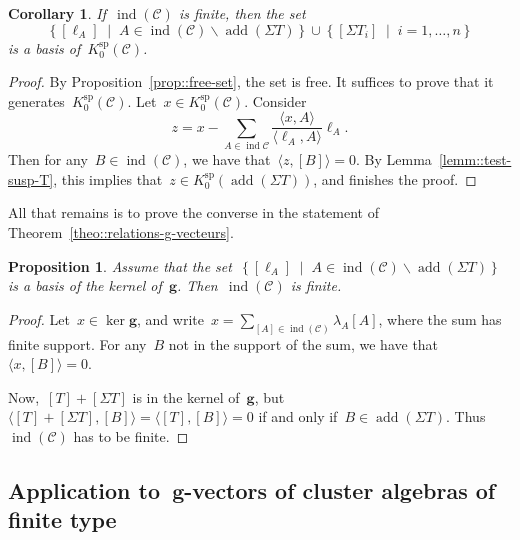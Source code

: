 \documentclass{amsart}
\newtheorem{corollary}[theorem]{Corollary}
\newtheorem{proposition}[theorem]{Proposition}
\theoremstyle{definition}
\renewcommand{\b}[1]{{\boldsymbol{#1}}} %
\newcommand{\set}[2]{\left\{ #1 \;\middle|\; #2 \right\}} %
\newcommand{\ssm}{\smallsetminus} %
\newcommand{\cat}{\mathcal{C}}
\newcommand{\susp}{\Sigma}
\newcommand{\add}{\operatorname{add}}
\newcommand{\spl}{\operatorname{sp}}
\newcommand{\Ksp}{K_0^{\spl}}
\newcommand{\ind}{\operatorname{ind}}
\begin{document}
\begin{corollary}
 If~$\ind(\cat)$ is finite, then the set
 \[
 \set{[\ell_A]}{A\in \ind(\cat) \ssm \add(\susp T)} \cup \set{[\susp T_i]}{i=1, \ldots, n}
 \]
 is a basis of~$\Ksp(\cat)$.
\end{corollary}
\begin{proof}
 By Proposition~\ref{prop::free-set}, the set is free.  It suffices to prove that it generates~$\Ksp(\cat)$.  Let~$x\in \Ksp(\cat)$.  Consider
 \[
  z = x - \sum_{A\in \ind{\cat}} \frac{\langle x, A \rangle}{\langle \ell_A, A\rangle} \ell_A.
 \]
 Then for any~$B\in \ind(\cat)$, we have that~$\langle z, [B] \rangle = 0$.  By Lemma~\ref{lemm::test-susp-T}, this implies that~$z\in \Ksp(\add(\susp T))$, and finishes the proof.
\end{proof}


All that remains is to prove the converse in the statement of Theorem~\ref{theo::relations-g-vecteurs}.

\begin{proposition}
 Assume that the set~$\set{[\ell_A]}{A\in \ind(\cat) \ssm \add(\susp T)}$ is a basis of the kernel of~$\b g$. Then~$\ind(\cat)$ is finite.
\end{proposition}
\begin{proof}
 Let~$x\in \ker \b g$, and write~$x = \sum_{[A]\in \ind(\cat)} \lambda_A[A]$, where the sum has finite support.  For any~$B$ not in the support of the sum, we have that~$\langle x, [B] \rangle = 0$.
 
 Now,~$[T]+[\susp T]$ is in the kernel of~$\b g$, but~$\langle [T] + [\susp T], [B] \rangle = \langle [T], [B] \rangle = 0$ if and only if~$B\in \add(\susp T)$.  Thus~$\ind(\cat)$ has to be finite.
\end{proof}


\subsection{Application to~$\b g$-vectors of cluster algebras of finite type}
\label{sect::applications-g-vectors}
\end{document}
